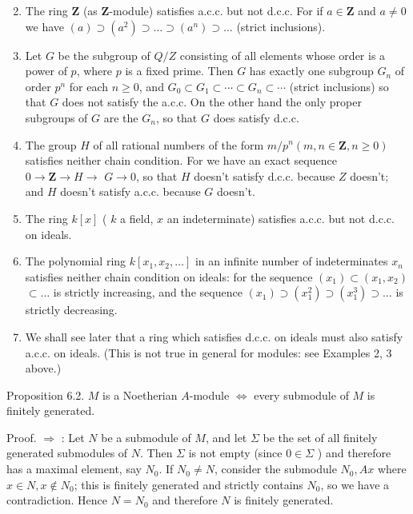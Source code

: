 \documentclass{standalone}
\theoremstyle{definition}
\theoremstyle{remark}
\begin{document}
\begin{enumerate}
  \setcounter{enumi}{1}
  \item The ring $\mathbf{Z}$ (as $\mathbf{Z}$-module) satisfies a.c.c. but not d.c.c. For if $a \in \mathbf{Z}$ and $a \neq 0$ we have $(a) \supset\left(a^{2}\right) \supset \ldots \supset\left(a^{n}\right) \supset \ldots$ (strict inclusions).

  \item Let $G$ be the subgroup of $Q / Z$ consisting of all elements whose order is a power of $p$, where $p$ is a fixed prime. Then $G$ has exactly one subgroup $G_{n}$ of order $p^{n}$ for each $n \geqslant 0$, and $G_{0} \subset G_{1} \subset \cdots \subset G_{n} \subset \cdots$ (strict inclusions) so that $G$ does not satisfy the a.c.c. On the other hand the only proper subgroups of $G$ are the $G_{n}$, so that $G$ does satisfy d.c.c.

  \item The group $H$ of all rational numbers of the form $m / p^{n}(m, n \in \mathbf{Z}, n \geqslant 0)$ satisfies neither chain condition. For we have an exact sequence $0 \rightarrow \mathbf{Z} \rightarrow H \rightarrow$ $G \rightarrow 0$, so that $H$ doesn't satisfy d.c.c. because $Z$ doesn't; and $H$ doesn't satisfy a.c.c. because $G$ doesn't.

  \item The ring $k[x]$ ( $k$ a field, $x$ an indeterminate) satisfies a.c.c. but not d.c.c. on ideals.

  \item The polynomial ring $k\left[x_{1}, x_{2}, \ldots\right]$ in an infinite number of indeterminates $x_{n}$ satisfies neither chain condition on ideals: for the sequence $\left(x_{1}\right) \subset\left(x_{1}, x_{2}\right)$ $\subset \ldots$ is strictly increasing, and the sequence $\left(x_{1}\right) \supset\left(x_{1}^{2}\right) \supset\left(x_{1}^{3}\right) \supset \ldots$ is strictly decreasing.

  \item We shall see later that a ring which satisfies d.c.c. on ideals must also satisfy a.c.c. on ideals. (This is not true in general for modules: see Examples 2, 3 above.)

\end{enumerate}

Proposition 6.2. $M$ is a Noetherian $A$-module $\Leftrightarrow$ every submodule of $M$ is finitely generated.

Proof. $\Rightarrow$ : Let $N$ be a submodule of $M$, and let $\Sigma$ be the set of all finitely generated submodules of $N$. Then $\Sigma$ is not empty (since $0 \in \Sigma$ ) and therefore has a maximal element, say $N_{0}$. If $N_{0} \neq N$, consider the submodule $N_{0}, A x$ where $x \in N, x \notin N_{0}$; this is finitely generated and strictly contains $N_{0}$, so we have a contradiction. Hence $N=N_{0}$ and therefore $N$ is finitely generated.
\end{document}
